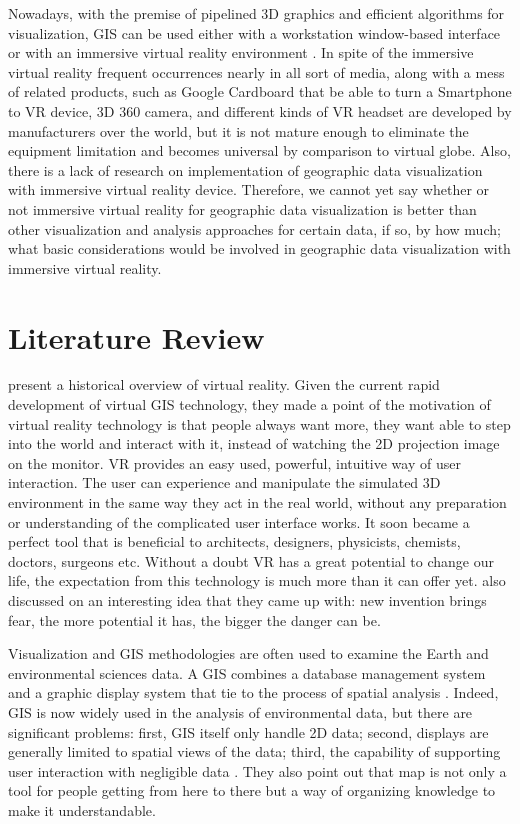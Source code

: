 Nowadays, with the premise of pipelined 3D graphics and efficient algorithms for visualization, GIS can be used either with a workstation window-based interface or with an immersive virtual reality environment \cite{koller.virtual-gis.1995}. In spite of the immersive virtual reality frequent occurrences nearly in all sort of media, along with a mess of related products, such as Google Cardboard that be able to turn a Smartphone to VR device, 3D 360 camera, and different kinds of VR headset are developed by manufacturers over the world, but it is not mature enough to eliminate the equipment limitation and becomes universal by comparison to virtual globe. Also, there is a lack of research on implementation of geographic data visualization with immersive virtual reality device. Therefore, we cannot yet say whether or not immersive virtual reality for geographic data visualization is better than other visualization and analysis approaches for certain data, if so, by how much; what basic considerations would be involved in geographic data visualization with immersive virtual reality.

\section{Literature Review}
\label{section:literature-review}

\cite{mazuryk.vr.1996} present a historical overview of virtual reality. Given the current rapid development of virtual GIS technology, they made a point of the motivation of virtual reality technology is that people always want more, they want able to step into the world and interact with it, instead of watching the 2D projection image on the monitor. VR provides an easy used, powerful, intuitive way of user interaction. The user can experience and manipulate the simulated 3D environment in the same way they act in the real world, without any preparation or understanding of the complicated user interface works. It soon became a perfect tool that is beneficial to architects, designers, physicists, chemists, doctors, surgeons etc. Without a doubt VR has a great potential to change our life, the expectation from this technology is much more than it can offer yet. \cite{mazuryk.vr.1996} also discussed on an interesting idea that they came up with: new invention brings fear, the more potential it has, the bigger the danger can be.

Visualization and GIS methodologies are often used to examine the Earth and environmental sciences data. A GIS combines a database management system and a graphic display system that tie to the process of spatial analysis \cite{rhyne.visualization-gis.1994, rhyne.virtual.1997}. Indeed, GIS is now widely used in the analysis of environmental data, but there are significant problems: first, GIS itself only handle 2D data; second, displays are generally limited to spatial views of the data; third, the capability of supporting user interaction with  negligible data \cite{rhyne.visualization-gis.1994}. They also point out that map is not only a tool for people getting from here to there but a way of organizing knowledge to make it understandable.

